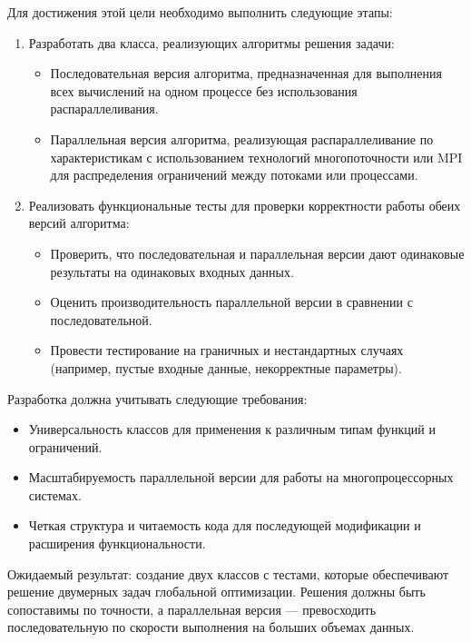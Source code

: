 \documentclass[a4paper,12pt]{article}
\begin{document}
Для достижения этой цели необходимо выполнить следующие этапы:
\begin{enumerate}
    \item Разработать два класса, реализующих алгоритмы решения задачи:
    \begin{itemize}
        \item Последовательная версия алгоритма, предназначенная для выполнения всех вычислений на одном процессе без использования распараллеливания.
        \item Параллельная версия алгоритма, реализующая распараллеливание по характеристикам с использованием технологий многопоточности или MPI для распределения ограничений между потоками или процессами.
    \end{itemize}
    \item Реализовать функциональные тесты для проверки корректности работы обеих версий алгоритма:
    \begin{itemize}
        \item Проверить, что последовательная и параллельная версии дают одинаковые результаты на одинаковых входных данных.
        \item Оценить производительность параллельной версии в сравнении с последовательной.
        \item Провести тестирование на граничных и нестандартных случаях (например, пустые входные данные, некорректные параметры).
    \end{itemize}
\end{enumerate}

Разработка должна учитывать следующие требования:
\begin{itemize}
    \item Универсальность классов для применения к различным типам функций и ограничений.
    \item Масштабируемость параллельной версии для работы на многопроцессорных системах.
    \item Четкая структура и читаемость кода для последующей модификации и расширения функциональности.
\end{itemize}

Ожидаемый результат: создание двух классов с тестами, которые обеспечивают решение двумерных задач глобальной оптимизации. Решения должны быть сопоставимы по точности, а параллельная версия — превосходить последовательную по скорости выполнения на больших объемах данных.

\newpage
\end{document}
